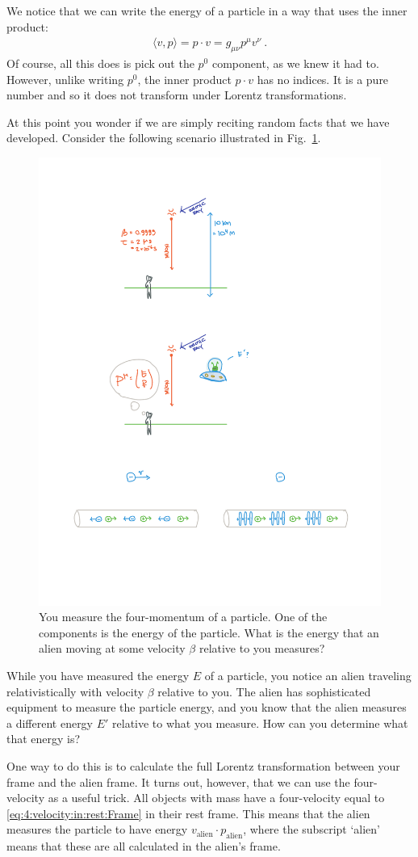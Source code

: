 \documentclass[12pt]{article}
\begin{document}
We notice that we can write the energy of a particle in a way that uses the inner product:
\begin{align}
    \langle v, p\rangle = p\cdot v = g_{\mu\nu} p^\mu v^\nu \ .
\end{align}
Of course, all this does is pick out the $p^0$ component, as we knew it had to. However, unlike writing $p^0$, the inner product $p\cdot v$ has no indices. It is a pure number and so it does not transform under Lorentz transformations. 

At this point you wonder if we are simply reciting random facts that we have developed. Consider the following scenario illustrated in Fig.~\ref{fig:alien}.
% 
\begin{figure}[tb]
    \centering
    \includegraphics[width=.5\textwidth]{figures/alien.pdf}
    \caption{You measure the four-momentum of a particle. One of the components is the energy of the particle. What is the energy that an alien moving at some velocity $\beta$ relative to you measures?}
    \label{fig:alien}
\end{figure}
% 
While you have measured the energy $E$ of a particle, you notice an alien traveling relativistically with velocity $\beta$ relative to you. The alien has sophisticated equipment to measure the particle energy, and you know that the alien measures a different energy $E'$ relative to what you measure. How can you determine what that energy is?

One way to do this is to calculate the full Lorentz transformation between your frame and the alien frame. It turns out, however, that we can use the four-velocity as a useful trick. All objects with mass have a four-velocity equal to \eqref{eq:4:velocity:in:rest:Frame} in their rest frame. This means that the alien measures the particle to have energy $v_\text{alien}\cdot p_\text{alien}$, where the subscript `alien' means that these are all calculated in the alien's frame.
\end{document}
